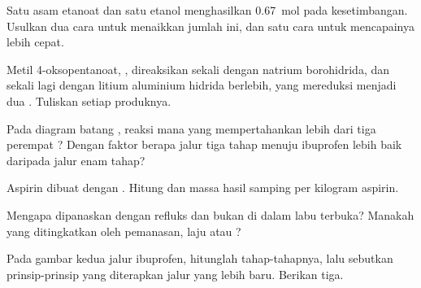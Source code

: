 \begin{exercise}[$\star\star$]\label{exo:g12:synthesis-strategy:6}
Satu  asam etanoat dan satu  etanol menghasilkan \qty{0.67}{mol}
 pada kesetimbangan. Usulkan dua cara untuk menaikkan jumlah ini,
dan satu cara untuk mencapainya lebih cepat.
\end{exercise}

\begin{exercise}[$\star\star$]\label{exo:g12:synthesis-strategy:7}
Metil 4-oksopentanoat, , direaksikan sekali
dengan natrium borohidrida, dan sekali lagi dengan litium aluminium
hidrida berlebih, yang mereduksi  menjadi dua . Tuliskan
setiap produknya.
\end{exercise}

\begin{exercise}[$\star\star$]\label{exo:g12:synthesis-strategy:8}
Pada diagram batang , reaksi mana yang mempertahankan lebih
dari tiga perempat ? Dengan faktor berapa jalur tiga tahap menuju
ibuprofen lebih baik daripada jalur enam tahap?
\end{exercise}

\begin{exercise}[$\star\star$]\label{exo:g12:synthesis-strategy:9}
Aspirin dibuat dengan . Hitung
 dan massa hasil samping per kilogram aspirin.
\end{exercise}

\begin{exercise}[$\star\star$]\label{exo:g12:synthesis-strategy:10}
Mengapa  dipanaskan dengan refluks dan bukan di dalam labu
terbuka? Manakah yang ditingkatkan oleh pemanasan, laju atau ?
\end{exercise}

\begin{exercise}[$\star\star$]\label{exo:g12:synthesis-strategy:11}
Pada gambar kedua jalur ibuprofen, hitunglah tahap-tahapnya, lalu
sebutkan prinsip-prinsip  yang diterapkan jalur yang lebih
baru. Berikan tiga.
\end{exercise}

